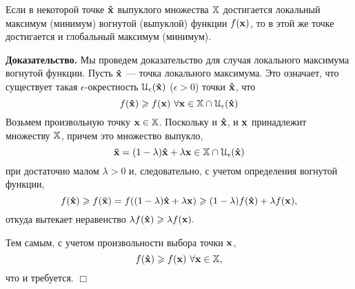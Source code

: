 



\begin{prop}
    Если в некоторой точке $\mathbf{\hat x}$ выпуклого множества $\mathbb{X}$
    достигается локальный максимум (минимум) вогнутой  (выпуклой)
    функции $f(\mathbf{x})$, то в этой же
  точке достигается и глобальный максимум  (минимум).
\end{prop}
    \textbf{Доказательство.} Мы проведем доказательство для случая локального
    максимума вогнутой функции. Пусть $\mathbf{\hat x}$ --- точка
    локального максимума. Это означает, что существует такая
    $\epsilon$-окрестность $\mathcal{U}_{\epsilon}(\mathbf{\hat x})$ ($\epsilon>0$) точки
    $\mathbf{\hat x}$, что
\[
    f(\mathbf{\hat x})\geqslant f(\mathbf{x}) \
    \forall \mathbf{x}\in\mathbb{X}\cap\mathcal{U}_{\epsilon}(\mathbf{\hat x})
\]
    Возьмем произвольную точку $\mathbf{x}\in\mathbb{X}$. Поскольку и
    $\mathbf{\hat x}$, и $\mathbf{x}$ принадлежит множеству $\mathbb{X}$, причем
    это множество выпукло,
\[
    \mathbf{\bar{x}}=(1-\lambda)\mathbf{\hat{x}}+\lambda\mathbf{x}
    \in\mathbb{X}\cap\mathcal{U}_{\epsilon}(\mathbf{\hat x})
\]
    при достаточно малом $\lambda>0$ и, следовательно, с учетом
    определения вогнутой функции,
\[
    f(\mathbf{\hat{x}})\geqslant f(\mathbf{\bar{x}})= f((1-\lambda)\mathbf{\hat{x}}+\lambda\mathbf{x})
    \geqslant(1-\lambda)f(\mathbf{\hat{x}})+\lambda f(\mathbf{x}),
\]
    откуда вытекает неравенство $\lambda f(\mathbf{\hat{x}})\geqslant \lambda f(\mathbf{x}).$

    Тем самым, с учетом произвольности выбора точки $\mathbf{x}$,
\[
    f(\mathbf{\hat{x}})\geqslant f(\mathbf{x}) \ \forall \mathbf{x}\in\mathbb{X},
\]
    что и требуется. $\Box$


